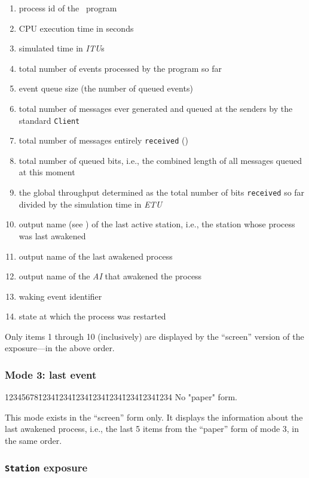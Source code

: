 \begin{enumerate}
\item
process id of the \smurph\ program
\item
CPU execution time in seconds
\item
simulated time in {\em ITU\/}s
\item
total number of events processed by the program so far
\item
event queue size (the number of queued events)
\item
total number of messages ever generated and queued at the senders by the
standard {\tt Client}
\item
total number of messages entirely {\tt received}
()
\item
total number of queued bits, i.e., the combined length of all messages
queued at this moment
\item
the global throughput determined as the total number of bits
{\tt received} so far divided by the simulation time in {\em ETU}
\item
output name (see ) of the last active station, i.e.,
the station whose process was last awakened
\item
output name of the last awakened process
\item
output name of the {\em AI\/} that awakened the process
\item
waking event identifier
\item
state at which the process was restarted
\end{enumerate}

Only items 1 through 10 (inclusively) are displayed by the ``screen'' version
of the exposure---in the above order.

\subsubsection*{Mode 3: last event}

{\tt\begin{tabbing}
12345678\=1234\=1234\=1234\=1234\=1234\=1234\=1234\=1234\kill
No "paper" form.
\end{tabbing}}

This mode exists in the ``screen'' form only.
It displays the information about the last awakened process, i.e., the
last 5 items from the ``paper'' form of mode 3, in the same order.

\subsubsection{{\tt Station} exposure}
\label{rm_ex_se_st}

